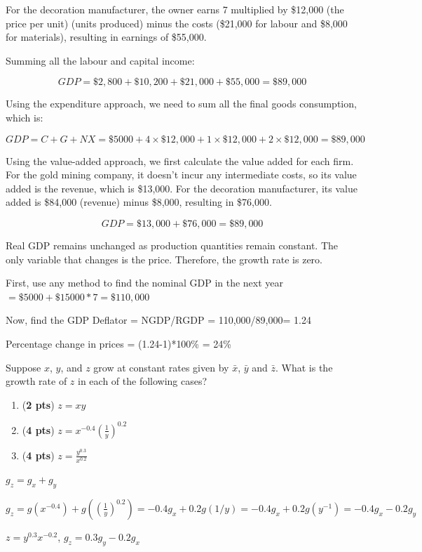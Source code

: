 \documentclass[addpoints,12pt,answers]{exam}
\begin{document}
\begin{questions}
\begin{solution}
\begin{parts}
				For the decoration manufacturer, the owner earns 7  multiplied by \$12,000 (the price per unit) (units produced) minus the costs (\$21,000  for labour and \$8,000 for materials), resulting in earnings of \$55,000. 
				
				Summing all the labour and capital income:
				
				\[
				GDP = \$2,800 + \$10,200 + \$21,000 + \$55,000 = \$89,000
				\]
				
				Using the expenditure approach, we need to sum all the final goods consumption, which is:
				
				\[
				GDP = C + G + NX = \$5000 + 4 \times \$12,000 + 1 \times \$12,000 + 2 \times \$12,000 = \$89,000
				\]
				
				Using the value-added approach, we first calculate the value added for each firm. For the gold mining company, it doesn't incur any intermediate costs, so its value added is the revenue, which is \$13,000. For the decoration manufacturer, its value added is \$84,000 (revenue) minus \$8,000, resulting in \$76,000.
				
				\[
				GDP = \$13,000 + \$76,000 = \$89,000
				\]
				\item 
				Real GDP remains unchanged as production quantities remain constant. The only variable that changes is the price. Therefore, the growth rate is zero. 
				\item 
				First, use any method to find the nominal GDP in the next year $= \$5000 + \$15000*7 = \$110,000$
				
				Now, find the GDP Deflator = NGDP/RGDP = 110,000/89,000= 1.24
				
				Percentage change in prices = (1.24-1)*100\% = 24\%
			\end{parts}
		\end{solution}
		\clearpage
	

		\clearpage
		\question  [10]  Suppose $x$, $y$, and $z$ grow at constant rates given by $\bar{x}$, $\bar{y}$ and $\bar{z}$. What is the growth rate of $z$ in each of the following cases?
		\begin{enumerate}[label=(\alph*)]
			\item (\textbf{2 pts}) $z=xy$
			\item (\textbf{4 pts}) $z=x^{-0.4} \left(\frac{1}{y}\right)^{0.2}$
			\item (\textbf{4 pts}) $z= \frac{y^{0.3}}{x^{0.2}}$
		\end{enumerate}
		\clearpage
		\begin{solution}
			\begin{parts}
				\item $g_z = g_x+g_y$
				\item $g_z = g(x^{-0.4}) + g\left(\left(\frac{1}{y}\right)^{0.2}\right) = -0.4g_x + 0.2g(1/y) = -0.4g_x +0.2g(y^{-1}) = -0.4g_x -0.2g_y$
				\item $z=y^{0.3}x^{-0.2}$, $g_z = 0.3g_y -0.2g_x$
			\end{parts}
		\end{solution}
		

\end{questions}
\end{document}
